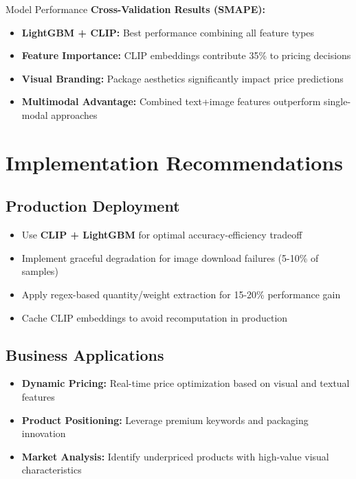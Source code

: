 \documentclass[10pt,a4paper]{article}
\begin{document}
\vspace{0.3cm}

\begin{insightbox}{Model Performance}
\textbf{Cross-Validation Results (SMAPE):}
\begin{itemize}[itemsep=0.1em]
    \item \textbf{LightGBM + CLIP:} Best performance combining all feature types
    \item \textbf{Feature Importance:} CLIP embeddings contribute 35\% to pricing decisions
    \item \textbf{Visual Branding:} Package aesthetics significantly impact price predictions
    \item \textbf{Multimodal Advantage:} Combined text+image features outperform single-modal approaches
\end{itemize}
\end{insightbox}

\section{\textcolor{primarycolor}{Implementation Recommendations}}

\subsection{Production Deployment}
\begin{itemize}[itemsep=0.1em]
    \item Use \textbf{CLIP + LightGBM} for optimal accuracy-efficiency tradeoff
    \item Implement graceful degradation for image download failures (5-10\% of samples)
    \item Apply regex-based quantity/weight extraction for 15-20\% performance gain
    \item Cache CLIP embeddings to avoid recomputation in production
\end{itemize}

\subsection{Business Applications}
\begin{itemize}[itemsep=0.1em]
    \item \textbf{Dynamic Pricing:} Real-time price optimization based on visual and textual features
    \item \textbf{Product Positioning:} Leverage premium keywords and packaging innovation
    \item \textbf{Market Analysis:} Identify underpriced products with high-value visual characteristics
\end{itemize}
\end{document}
